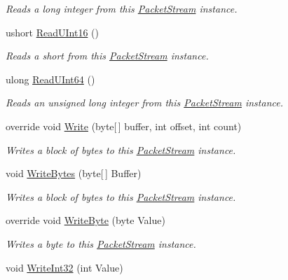 \begin{DoxyCompactItemize}
\begin{DoxyCompactList}\small\item\em Reads a long integer from this \hyperlink{class_gonzo_net_1_1_packet_stream}{Packet\+Stream} instance. \end{DoxyCompactList}\item 
ushort \hyperlink{class_gonzo_net_1_1_packet_stream_a79aa766c46bf0fa8b92e887551456312}{Read\+U\+Int16} ()
\begin{DoxyCompactList}\small\item\em Reads a short from this \hyperlink{class_gonzo_net_1_1_packet_stream}{Packet\+Stream} instance. \end{DoxyCompactList}\item 
ulong \hyperlink{class_gonzo_net_1_1_packet_stream_a6789f5248e9547af953eaaed99a8c7df}{Read\+U\+Int64} ()
\begin{DoxyCompactList}\small\item\em Reads an unsigned long integer from this \hyperlink{class_gonzo_net_1_1_packet_stream}{Packet\+Stream} instance. \end{DoxyCompactList}\item 
override void \hyperlink{class_gonzo_net_1_1_packet_stream_a73dd3a8afc2f874febf8e541585daa31}{Write} (byte\mbox{[}$\,$\mbox{]} buffer, int offset, int count)
\begin{DoxyCompactList}\small\item\em Writes a block of bytes to this \hyperlink{class_gonzo_net_1_1_packet_stream}{Packet\+Stream} instance. \end{DoxyCompactList}\item 
void \hyperlink{class_gonzo_net_1_1_packet_stream_a0803fc32dbd8f002bade1616265e1cb2}{Write\+Bytes} (byte\mbox{[}$\,$\mbox{]} Buffer)
\begin{DoxyCompactList}\small\item\em Writes a block of bytes to this \hyperlink{class_gonzo_net_1_1_packet_stream}{Packet\+Stream} instance. \end{DoxyCompactList}\item 
override void \hyperlink{class_gonzo_net_1_1_packet_stream_ab7d4ddbdf851e2507136c06cfc9d3947}{Write\+Byte} (byte Value)
\begin{DoxyCompactList}\small\item\em Writes a byte to this \hyperlink{class_gonzo_net_1_1_packet_stream}{Packet\+Stream} instance. \end{DoxyCompactList}\item 
void \hyperlink{class_gonzo_net_1_1_packet_stream_adb32ecaa109c5f3475d8e99c617cca77}{Write\+Int32} (int Value)

\end{DoxyCompactItemize}
